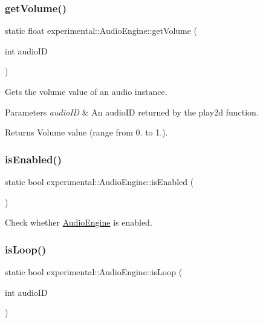 \subsubsection{\texorpdfstring{get\+Volume()}{getVolume()}\hspace{0.1cm}{\footnotesize\ttfamily [2/2]}}
{\footnotesize\ttfamily static float experimental\+::\+Audio\+Engine\+::get\+Volume (\begin{DoxyParamCaption}\item[{int}]{audio\+ID }\end{DoxyParamCaption})\hspace{0.3cm}{\ttfamily [static]}}

Gets the volume value of an audio instance.


\begin{DoxyParams}{Parameters}
{\em audio\+ID} & An audio\+ID returned by the play2d function. \\
\hline
\end{DoxyParams}
\begin{DoxyReturn}{Returns}
Volume value (range from 0. to 1.). 
\end{DoxyReturn}
\mbox{\label{classexperimental_1_1AudioEngine_ad19723d962f48b9b25feb73382d6688c}} 
\subsubsection{\texorpdfstring{is\+Enabled()}{isEnabled()}}
{\footnotesize\ttfamily static bool experimental\+::\+Audio\+Engine\+::is\+Enabled (\begin{DoxyParamCaption}{ }\end{DoxyParamCaption})\hspace{0.3cm}{\ttfamily [static]}}

Check whether \hyperlink{classexperimental_1_1AudioEngine}{Audio\+Engine} is enabled. \mbox{\label{classexperimental_1_1AudioEngine_a7a636855b8bd54af196a9f6947791d3b}} 
\subsubsection{\texorpdfstring{is\+Loop()}{isLoop()}\hspace{0.1cm}{\footnotesize\ttfamily [1/2]}}
{\footnotesize\ttfamily static bool experimental\+::\+Audio\+Engine\+::is\+Loop (\begin{DoxyParamCaption}\item[{int}]{audio\+ID }\end{DoxyParamCaption})\hspace{0.3cm}{\ttfamily [static]}}

